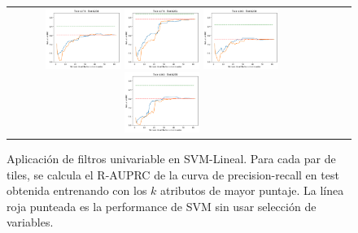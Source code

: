 \begin{figure}[h!]
\begin{tabular}{cccc}
\includegraphics[width=0.25\textwidth]{Kap5/linear_ALL_METHODS_train=b278test=b234}  \includegraphics[width=0.25\textwidth]{Kap5/linear_ALL_METHODS_train=b278test=b261} 
 \includegraphics[width=0.25\textwidth]{Kap5/linear_ALL_METHODS_train=b360test=b234}  \includegraphics[width=0.25\textwidth]{Kap5/linear_ALL_METHODS_train=b360test=b278} 
\end{tabular}
\caption{Aplicación de filtros univariable en SVM-Lineal. Para cada par de tiles, se calcula el R-AUPRC de la curva de precision-recall en test obtenida entrenando con los $k$ atributos de mayor puntaje. La línea roja punteada es la performance de SVM sin usar selección de variables.}
\label{fig:svml_univariate}
\end{figure}

